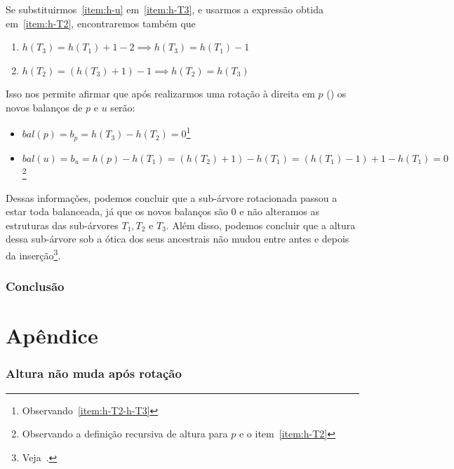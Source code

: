 \documentclass[11pt,twoside]{article}
\theoremstyle{definition}
\begin{document}
Se substituirmos~\ref{item:h-u} em~\ref{item:h-T3}, e usarmos a expressão obtida em~\ref{item:h-T2}, encontraremos também que
\begin{enumerate}[label={\Roman*.}, resume=alturas-simples]
	\item \( h(T_3) = h(T_1) + 1 - 2 \implies h(T_3) = h(T_1) - 1 \)
	\item \label{item:h-T2-h-T3} \( h(T_2) = (h(T_3) + 1) - 1 \implies h(T_2) = h(T_3) \)
\end{enumerate}

Isso nos permite afirmar que após realizarmos uma rotação à direita em \( p \) () os novos balanços de \( p \) e \( u \) serão:
\begin{itemize}
	\item \( bal(p) = b_p = h(T_3) - h(T_2) = 0 \)\footnote{Observando~\ref{item:h-T2-h-T3}}
	\item \( bal(u) = b_u = h(p) - h(T_1) = (h(T_2) + 1) - h(T_1) = (h(T_1) - 1) + 1 - h(T_1) = 0 \)\footnote{Observando a definição recursiva de altura para \( p \) e o item~\ref{item:h-T2}}
\end{itemize}

\begin{figure}[hbt]
	\caption{\label{fig:ins-rot-dir-post}}
	\centering
	
\end{figure}

Dessas informações, podemos concluir que a sub-árvore rotacionada passou a estar toda balanceada, já que os novos balanços são 0 e não alteramos as estruturas das sub-árvores \( T_1, T_2 \) e \( T_3 \). Além disso, podemos concluir que a altura dessa sub-árvore sob a ótica dos seus ancestrais não mudou entre antes e depois da inserção\footnote{Veja~.}.

\section{Conclusão}


\part*{Apêndice}

\section{Altura não muda após rotação}
\label{block:altura-nao-muda}


\end{document}
